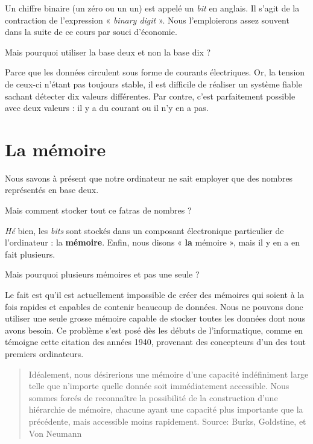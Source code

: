 Un chiffre binaire (un zéro ou un un) est appelé un \emph{bit} en
anglais. Il s'agit de la contraction de l'expression « \emph{binary
  digit} ». Nous l'emploierons assez souvent dans la suite de ce cours
par souci d'économie.

\begin{questionbox}
 Mais pourquoi utiliser la base deux et non la base dix ?
\end{questionbox}



Parce que les données circulent sous forme de courants
électriques. Or, la tension de ceux-ci n'étant pas toujours stable, il
est difficile de réaliser un système fiable sachant détecter dix
valeurs différentes. Par contre, c'est parfaitement possible avec deux
valeurs : il y a du courant ou il n'y en a pas.

\section{La mémoire}\label{la-memoire}

Nous savons à présent que notre ordinateur ne sait employer que des
nombres représentés en base deux.

\begin{questionbox}
 Mais comment stocker tout ce fatras de nombres ?
\end{questionbox}


\emph{Hé} bien, les \emph{bits} sont stockés dans un composant
électronique particulier de l'ordinateur : la \textbf{mémoire}. Enfin,
nous disons « \textbf{la} mémoire », mais il y en a en fait plusieurs.

\begin{questionbox}
 Mais pourquoi plusieurs mémoires et pas une seule ?
\end{questionbox}


Le fait est qu'il est actuellement impossible de créer des mémoires
qui soient à la fois rapides et capables de contenir beaucoup de
données.  Nous ne pouvons donc utiliser une seule grosse mémoire
capable de stocker toutes les données dont nous avons besoin. Ce
problème s'est posé dès les débuts de l'informatique, comme en
témoigne cette citation des années 1940, provenant des concepteurs
d'un des tout premiers ordinateurs.

\begin{quote}
  Idéalement, nous désirerions une mémoire d'une capacité indéfiniment
  large telle que n'importe quelle donnée soit immédiatement
  accessible.  Nous sommes forcés de reconnaître la possibilité de la
  construction d'une hiérarchie de mémoire, chacune ayant une capacité
  plus importante que la précédente, mais accessible moins
  rapidement. Source: Burks, Goldstine, et Von Neumann
\end{quote}

